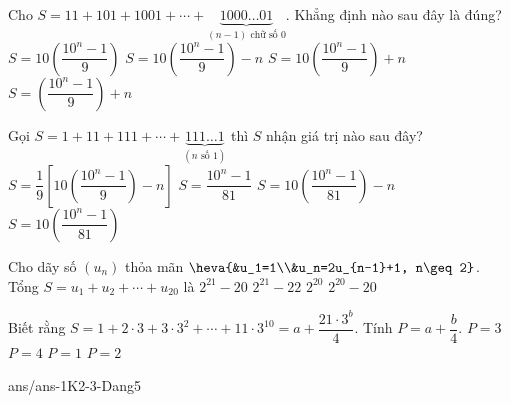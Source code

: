 \begin{ex}%
	Cho $S=11+101+1001+\cdots +\underbrace{1000\ldots 01}_{(n-1)\text{ chữ số 0}}$. Khẳng định nào sau đây là đúng?
	\choice
	{$S=10\left(\dfrac{10^n-1}{9}\right)$}
	{$S=10\left(\dfrac{10^n-1}{9}\right)-n$}
	{\True $S=10\left(\dfrac{10^n-1}{9}\right)+n$}
	{$S=\left(\dfrac{10^n-1}{9}\right)+n$}
\end{ex}
\begin{ex}%
	Gọi $S=1+11+111+\cdots+\underbrace{111\ldots1}_{(n\text{ số }1)}$ thì $S$ nhận giá trị nào sau đây?
	\choice
	{\True $S=\dfrac{1}{9}\left[10\left(\dfrac{10^n-1}{9}\right)-n \right]$}
	{$S=\dfrac{10^n-1}{81}$}
	{$S=10\left(\dfrac{10^n-1}{81}\right)-n$}
	{$S=10\left(\dfrac{10^n-1}{81} \right)$}
\end{ex}
\begin{ex}%
	Cho dãy số $(u_n)$ thỏa mãn $\heva{&u_1=1\\&u_n=2u_{n-1}+1, n\geq2}$. Tổng $S=u_1+u_2+ \cdots +u_{20}$ là
	\choice
	{$2^{21}-20$}
	{\True $2^{21}-22$}
	{$2^{20}$}
	{$2^{20}-20$}
\end{ex}
\begin{ex}%
	Biết rằng $S=1+2\cdot 3+{{3\cdot 3}^2}+\cdots+{{11\cdot 3}^{10}}=a+\dfrac{{{21\cdot 3}^{b}}}{4}$. Tính $P=a+\dfrac{b}{4}$.
	\choice
	{\True $P=3$}
	{$P=4$}
	{$P=1$}
	{$P=2$}
\end{ex}
\begin{indapan}{10}
	{ans/ans-1K2-3-Dang5}
\end{indapan}


